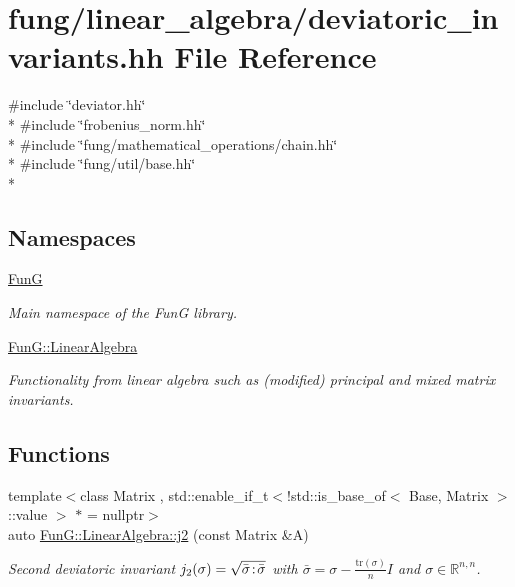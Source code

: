 \hypertarget{deviatoric__invariants_8hh}{}\section{fung/linear\+\_\+algebra/deviatoric\+\_\+invariants.hh File Reference}
\label{deviatoric__invariants_8hh}
{\ttfamily \#include \char`\"{}deviator.\+hh\char`\"{}}\\*
{\ttfamily \#include \char`\"{}frobenius\+\_\+norm.\+hh\char`\"{}}\\*
{\ttfamily \#include \char`\"{}fung/mathematical\+\_\+operations/chain.\+hh\char`\"{}}\\*
{\ttfamily \#include \char`\"{}fung/util/base.\+hh\char`\"{}}\\*
\subsection*{Namespaces}
\begin{DoxyCompactItemize}
\item 
 \hyperlink{namespaceFunG}{Fun\+G}
\begin{DoxyCompactList}\small\item\em Main namespace of the Fun\+G library. \end{DoxyCompactList}\item 
 \hyperlink{namespaceFunG_1_1LinearAlgebra}{Fun\+G\+::\+Linear\+Algebra}
\begin{DoxyCompactList}\small\item\em Functionality from linear algebra such as (modified) principal and mixed matrix invariants. \end{DoxyCompactList}\end{DoxyCompactItemize}
\subsection*{Functions}
\begin{DoxyCompactItemize}
\item 
{\footnotesize template$<$class Matrix , std\+::enable\+\_\+if\+\_\+t$<$!std\+::is\+\_\+base\+\_\+of$<$ Base, Matrix $>$\+::value $>$ $\ast$  = nullptr$>$ }\\auto \hyperlink{group__InvariantGroup_ga9a2bc859fe1ae34b1a3ada91a39d69df}{Fun\+G\+::\+Linear\+Algebra\+::j2} (const Matrix \&A)
\begin{DoxyCompactList}\small\item\em Second deviatoric invariant $ j_2(\sigma)=\sqrt{\bar\sigma\negthinspace:\negthinspace\bar\sigma} $ with $\bar\sigma = \sigma - \frac{\mathrm{tr}(\sigma)}{n}I$ and $\sigma\in\mathbb{R}^{n,n}$. \end{DoxyCompactList}\end{DoxyCompactItemize}
